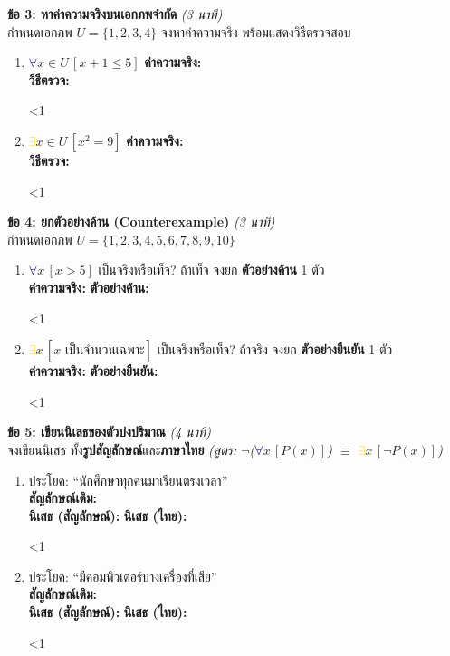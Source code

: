 \documentclass[a4paper,12pt]{article}
\newcounter{bl}
\newcommand{\blank}[1]{\par\vspace{0.2em}%
  \setcounter{bl}{0}\loop\ifnum\value{bl}<#1\relax
  \noindent\textcolor{gray!60}{\hrulefill}\par\vspace{1.0em}\stepcounter{bl}\repeat}
\newcommand{\A}{\textcolor{navy}{$\forall$}}
\newcommand{\E}{\textcolor{gold}{$\exists$}}
\begin{document}
\noindent\textbf{ข้อ 3: หาค่าความจริงบนเอกภพจำกัด} \hfill \textit{(3 นาที)} \\
กำหนดเอกภพ $U = \{1, 2, 3, 4\}$ จงหาค่าความจริง พร้อมแสดงวิธีตรวจสอบ
\begin{enumerate}[label=\arabic*)]
  \item \A$x \in U\,[x + 1 \le 5]$ \hfill
        \textbf{ค่าความจริง:} \dotfill\\
        \textbf{วิธีตรวจ:} \blank{1}
  \item \E$x \in U\,[x^2 = 9]$ \hfill
        \textbf{ค่าความจริง:} \dotfill\\
        \textbf{วิธีตรวจ:} \blank{1}
\end{enumerate}

\noindent\textbf{ข้อ 4: ยกตัวอย่างค้าน (Counterexample)} \hfill \textit{(3 นาที)} \\
กำหนดเอกภพ $U = \{1, 2, 3, 4, 5, 6, 7, 8, 9, 10\}$
\begin{enumerate}[label=\arabic*)]
  \item \A$x\,[x > 5]$ เป็นจริงหรือเท็จ? ถ้าเท็จ จงยก \textbf{ตัวอย่างค้าน} 1 ตัว\\
        \textbf{ค่าความจริง:} \dotfill \quad \textbf{ตัวอย่างค้าน:} \blank{1}
  \item \E$x\,[x \text{ เป็นจำนวนเฉพาะ}]$ เป็นจริงหรือเท็จ? ถ้าจริง จงยก \textbf{ตัวอย่างยืนยัน} 1 ตัว\\
        \textbf{ค่าความจริง:} \dotfill \quad \textbf{ตัวอย่างยืนยัน:} \blank{1}
\end{enumerate}

\noindent\textbf{ข้อ 5: เขียนนิเสธของตัวบ่งปริมาณ} \hfill \textit{(4 นาที)} \\
จงเขียนนิเสธ ทั้ง\textbf{รูปสัญลักษณ์}และ\textbf{ภาษาไทย}
\quad\textit{(สูตร: $\neg$(\A$x\,[P(x)]$) $\equiv$ \E$x\,[\neg P(x)]$)}
\begin{enumerate}[label=\arabic*)]
  \item ประโยค: ``นักศึกษาทุกคนมาเรียนตรงเวลา''\\
        \textbf{สัญลักษณ์เดิม:} \dotfill\\
        \textbf{นิเสธ (สัญลักษณ์):} \dotfill \quad \textbf{นิเสธ (ไทย):} \blank{1}
  \item ประโยค: ``มีคอมพิวเตอร์บางเครื่องที่เสีย''\\
        \textbf{สัญลักษณ์เดิม:} \dotfill\\
        \textbf{นิเสธ (สัญลักษณ์):} \dotfill \quad \textbf{นิเสธ (ไทย):} \blank{1}
\end{enumerate}
\end{document}
